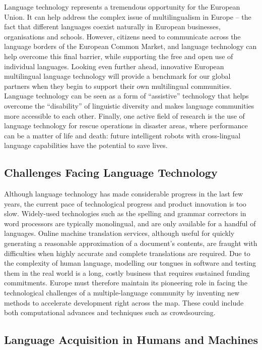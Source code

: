 \begin{multicols}{2}
Language technology represents a tremendous opportunity for the European Union. It can help address the complex issue of multilingualism in Europe – the fact that different languages coexist naturally in European businesses, organisations and schools. However, citizens need to communicate across the language borders of the European Common Market, and language technology can help overcome this final barrier, while supporting the free and open use of individual languages. Looking even further ahead, innovative European multilingual language technology will provide a benchmark for our global partners when they begin to support their own multilingual communities. Language technology can be seen as a form of “assistive” technology that helps overcome the “disability” of linguistic diversity and makes language communities more accessible to each other. Finally, one active field of research is the use of language technology for rescue operations in disaster areas, where performance can be a matter of life and death: future intelligent robots with cross-lingual language capabilities have the potential to save lives.

\subsection{Challenges Facing Language Technology}

Although language technology has made considerable progress in the last few years, the current pace of technological progress and product innovation is too slow. Widely-used technologies such as the spelling and grammar correctors in word processors are typically monolingual, and are only available for a handful of languages. Online machine translation services, although useful for quickly generating a reasonable approximation of a document’s contents, are fraught with difficulties when highly accurate and complete translations are required. Due to the complexity of human language, modelling our tongues in software and testing them in the real world is a long, costly business that requires sustained funding commitments. Europe must therefore maintain its pioneering role in facing the technological challenges of a multiple-language community by inventing new methods to accelerate development right across the map. These could include both computational advances and techniques such as crowdsourcing.


\subsection{Language Acquisition in Humans and Machines}


\end{multicols}
